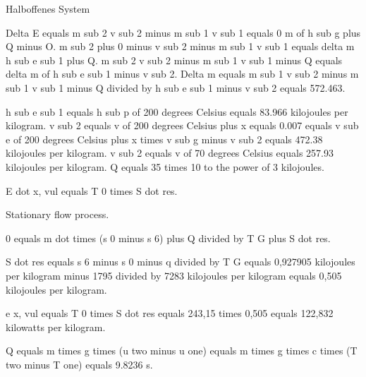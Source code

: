 Halboffenes System

Delta E equals m sub 2 v sub 2 minus m sub 1 v sub 1 equals 0 m of h sub g plus Q minus O. m sub 2 plus 0 minus v sub 2 minus m sub 1 v sub 1 equals delta m h sub e sub 1 plus Q. m sub 2 v sub 2 minus m sub 1 v sub 1 minus Q equals delta m of h sub e sub 1 minus v sub 2. Delta m equals m sub 1 v sub 2 minus m sub 1 v sub 1 minus Q divided by h sub e sub 1 minus v sub 2 equals 572.463.

h sub e sub 1 equals h sub p of 200 degrees Celsius equals 83.966 kilojoules per kilogram. v sub 2 equals v of 200 degrees Celsius plus x equals 0.007 equals v sub e of 200 degrees Celsius plus x times v sub g minus v sub 2 equals 472.38 kilojoules per kilogram. v sub 2 equals v of 70 degrees Celsius equals 257.93 kilojoules per kilogram. Q equals 35 times 10 to the power of 3 kilojoules.

E dot x, vul equals T 0 times S dot res.

Stationary flow process.

0 equals m dot times (s 0 minus s 6) plus Q divided by T G plus S dot res.

S dot res equals s 6 minus s 0 minus q divided by T G equals 0,927905 kilojoules per kilogram minus 1795 divided by 7283 kilojoules per kilogram equals 0,505 kilojoules per kilogram.

e x, vul equals T 0 times S dot res equals 243,15 times 0,505 equals 122,832 kilowatts per kilogram.

Q equals m times g times (u two minus u one) equals m times g times c times (T two minus T one) equals 9.8236 s.